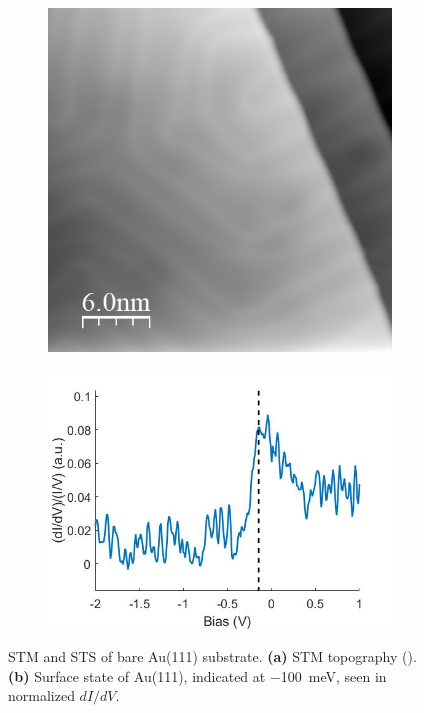 \begin{figure} [h]
    \centering
    \begin{subfigure}[t]{0.44\textwidth}
    \includegraphics[width=\textwidth]{pictures/au111_1V_5pA.jpg}
    \caption{}
    \end{subfigure}
    \hfill
    \begin{subfigure}[t]{0.53\textwidth}
    \includegraphics[width=\textwidth]{pictures/au111_surface_state.jpg}
    \caption{}
    \end{subfigure}
    
    \caption{STM and STS of bare Au(111) substrate. \textbf{(a)} STM topography (). \textbf{(b)} Surface state of Au(111), indicated at \SI{-100}{meV}, seen in normalized $dI/dV$.}
    \label{fig:expsetup:Au111}
\end{figure}


